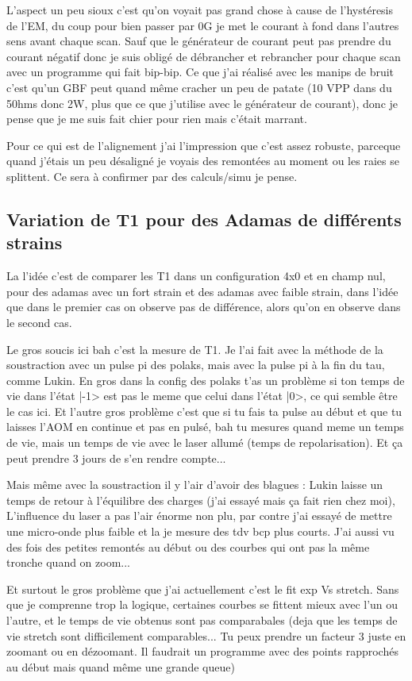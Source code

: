 \documentclass[a4paper]{report}
\begin{document}
  L'aspect un peu sioux c'est qu'on voyait pas grand chose à cause de l'hystéresis de l'EM, du coup pour bien passer par 0G je met le courant à fond dans l'autres sens avant chaque scan. Sauf que le générateur de courant peut pas prendre du courant négatif donc je suis obligé de débrancher et rebrancher pour chaque scan avec un programme qui fait bip-bip. Ce que j'ai réalisé avec les manips de bruit c'est qu'un GBF peut quand même cracher un peu de patate (10 VPP dans du 50hms donc 2W, plus que ce que j'utilise avec le générateur de courant), donc je pense que je me suis fait chier pour rien mais c'était marrant.
  
 Pour ce qui est de l'alignement j'ai l'impression que c'est assez robuste, parceque quand j'étais un peu désaligné je voyais des remontées au moment ou les raies se splittent. Ce sera à confirmer par des calculs/simu je pense.
 
 \subsection{Variation de T1 pour des Adamas de différents strains}
 La l'idée c'est de comparer les T1 dans un configuration 4x0 et en champ nul, pour des adamas avec un fort strain et des adamas avec faible strain, dans l'idée que dans le premier cas on observe pas de différence, alors qu'on en observe dans le second cas.
 
 Le gros soucis ici bah c'est la mesure de T1. Je l'ai fait avec la méthode de la soustraction avec un pulse pi des polaks, mais avec la pulse pi à la fin du tau, comme Lukin. En gros dans la config des polaks t'as un problème si ton temps de vie dans l'état |-1> est pas le meme que celui dans l'état |0>, ce qui semble être le cas ici. Et l'autre gros problème c'est que si tu fais ta pulse au début et que tu laisses l'AOM en continue et pas en pulsé, bah tu mesures quand meme un temps de vie, mais un temps de vie avec le laser allumé (temps de repolarisation). Et ça peut prendre 3 jours de s'en rendre compte...
 
 Mais même avec la soustraction il y l'air d'avoir des blagues : Lukin laisse un temps de retour à l'équilibre des charges (j'ai essayé mais ça fait rien chez moi), L'influence du laser a pas l'air énorme non plu, par contre j'ai essayé de mettre une micro-onde plus faible et la je mesure des tdv bcp plus courts. J'ai aussi vu des fois des petites remontés au début ou des courbes qui ont pas la même tronche quand on zoom...
 
 Et surtout le gros problème que j'ai actuellement c'est le fit exp Vs stretch. Sans que je comprenne trop la logique, certaines courbes se fittent mieux avec l'un ou l'autre, et le temps de vie obtenus sont pas comparabales (deja que les temps de vie stretch sont difficilement comparables... Tu peux prendre un facteur 3 juste en zoomant ou en dézoomant. Il faudrait un programme avec des points rapprochés au début mais quand même une grande queue)
 
\end{document}

